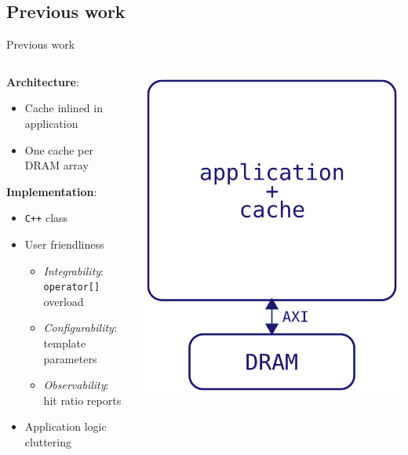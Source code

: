 \documentclass[aspectratio=169]{beamer}
\begin{document}
\subsection{Previous work}
\begin{frame}{Previous work}
	\begin{columns}[c]
		\begin{column}{.55\textwidth}
			\vfill
			\textbf{Architecture}:
			\begin{itemize}
				\item Cache inlined in application
				\item One cache per DRAM array
			\end{itemize}

			\textbf{Implementation}:
			\begin{itemize}
				\item \texttt{C++} class
				\item {User friendliness}
					\begin{itemize}
						\item \emph{Integrability}: \texttt{operator[]} overload
						\item \emph{Configurability}: template parameters
						\item \emph{Observability}: hit ratio reports
					\end{itemize}
				\item Application logic cluttering
			\end{itemize}
		\end{column}
		\begin{column}{.5\textwidth}
			\begin{center}
				\includegraphics[height=.5\textheight]{liang_arch}

\end{center}
\end{column}
\end{columns}
\end{frame}
\end{document}
